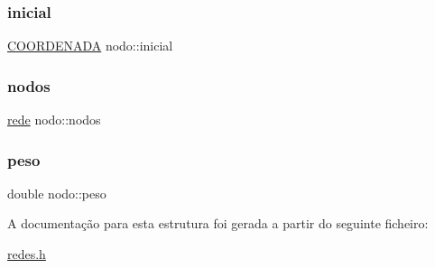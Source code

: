 \subsubsection{\texorpdfstring{inicial}{inicial}}
{\footnotesize\ttfamily \hyperlink{structCOORDENADA}{C\+O\+O\+R\+D\+E\+N\+A\+DA} nodo\+::inicial}

\mbox{\label{structnodo_a1cf8cb352c89ccfdb42abe37dd5ceede}} 
\subsubsection{\texorpdfstring{nodos}{nodos}}
{\footnotesize\ttfamily \hyperlink{redes_8h_ae4343d882310b4cf47638a1465eadaed}{rede} nodo\+::nodos}

\mbox{\label{structnodo_ad9af03d4d3cfe325790568dc7a99e479}} 
\subsubsection{\texorpdfstring{peso}{peso}}
{\footnotesize\ttfamily double nodo\+::peso}



A documentação para esta estrutura foi gerada a partir do seguinte ficheiro\+:\begin{DoxyCompactItemize}
\item 
\hyperlink{redes_8h}{redes.\+h}\end{DoxyCompactItemize}
